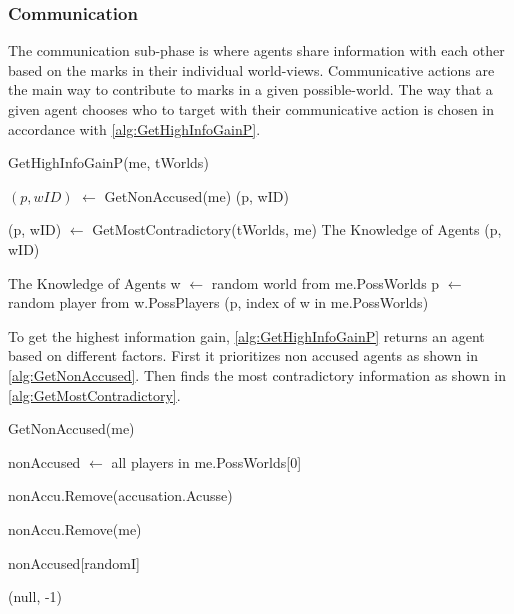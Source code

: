 \subsubsection{Communication}\label{sec:communication}
The communication sub-phase is where agents share information with each other
based on the marks in their individual world-views. Communicative actions are
the main way to contribute to marks in a given possible-world. The way that a
given agent chooses who to target with their communicative action is chosen in
accordance with \cref{alg:GetHighInfoGainP}.
\begin{algorithm}[H]
	\caption{GetHighInfoGainP(me, tWorlds)}
	\begin{algorithmic}
		\State $(p, wID)$ $\gets$ GetNonAccused(me)
		\State \Return (p, wID)
		\EndIf
		\EndIf

		\State (p, wID) $\gets$ GetMostContradictory(tWorlds, me)
		The Knowledge of Agents		\State \Return (p, wID)
		\EndIf

		The Knowledge of Agents \State w $\gets$ random world from me.PossWorlds \State
		p $\gets$ random player from w.PossPlayers \State \Return (p, index of w in
		me.PossWorlds)
	\end{algorithmic}\label{alg:GetHighInfoGainP}
\end{algorithm}
\setcounter{algorithmcaption}{2}
To get the highest information gain, \cref{alg:GetHighInfoGainP} returns an
agent based on different factors.
First it prioritizes non accused agents as shown in
\cref{alg:GetNonAccused}.
Then finds the most contradictory information as shown in
\cref{alg:GetMostContradictory}. \\
\begin{algorithm}[H]
	\caption{GetNonAccused(me)}
	\begin{algorithmic}
		\State nonAccused $\gets$ all players in me.PossWorlds[0]
		\EndIf

		\State nonAccu.Remove(accusation.Acusse)
		\EndFor

		\State nonAccu.Remove(me)

		\State \Return nonAccused[randomI]
		\EndIf

		\State \Return (null, -1)
	\end{algorithmic}\label{alg:GetNonAccused}
\end{algorithm}
